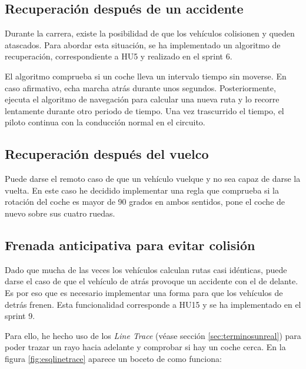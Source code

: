 \subsection{Recuperación después de un accidente}

Durante la carrera, existe la posibilidad de que los vehículos colisionen y queden atascados. Para abordar esta situación, se ha implementado un algoritmo de recuperación, correspondiente a HU5 y realizado en el sprint 6. 

\bigskip

El algoritmo comprueba si un coche lleva un intervalo tiempo sin moverse. En caso afirmativo, echa marcha atrás durante unos segundos. Posteriormente, ejecuta el algoritmo de navegación para calcular una nueva ruta y lo recorre lentamente durante otro periodo de tiempo. Una vez trascurrido el tiempo, el piloto continua con la conducción normal en el circuito.


\subsection{Recuperación después del vuelco}

Puede darse el remoto caso de que un vehículo vuelque y no sea capaz de darse la vuelta. En este caso he decidido implementar una regla que comprueba si la rotación del coche es mayor de 90 grados en ambos sentidos, pone el coche de nuevo sobre sus cuatro ruedas.


\subsection{Frenada anticipativa para evitar colisión}
\label{sec:frenada}

Dado que mucha de las veces los vehículos calculan rutas casi idénticas, puede darse el caso de que el vehículo de atrás provoque un accidente con el de delante. Es por eso que es necesario implementar una forma para que los vehículos de detrás frenen. Esta funcionalidad corresponde a HU15 y se ha implementado en el sprint 9.

\bigskip

Para ello, he hecho uso de los \textit{Line Trace} (véase sección \ref{sec:terminosunreal}) para poder trazar un rayo hacia adelante y comprobar si hay un coche cerca. En la figura \ref{fig:esqlinetrace} aparece un boceto de como funciona:

